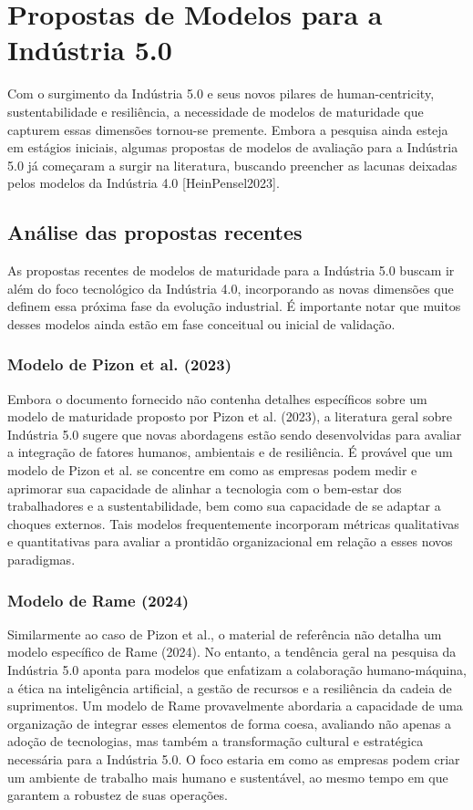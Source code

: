 \section{Propostas de Modelos para a Indústria 5.0}

Com o surgimento da Indústria 5.0 e seus novos pilares de human-centricity, sustentabilidade e resiliência, a necessidade de modelos de maturidade que capturem essas dimensões tornou-se premente. Embora a pesquisa ainda esteja em estágios iniciais, algumas propostas de modelos de avaliação para a Indústria 5.0 já começaram a surgir na literatura, buscando preencher as lacunas deixadas pelos modelos da Indústria 4.0 [HeinPensel2023].

\subsection{Análise das propostas recentes}

As propostas recentes de modelos de maturidade para a Indústria 5.0 buscam ir além do foco tecnológico da Indústria 4.0, incorporando as novas dimensões que definem essa próxima fase da evolução industrial. É importante notar que muitos desses modelos ainda estão em fase conceitual ou inicial de validação.

\subsubsection{Modelo de Pizon et al. (2023)}

Embora o documento fornecido não contenha detalhes específicos sobre um modelo de maturidade proposto por Pizon et al. (2023), a literatura geral sobre Indústria 5.0 sugere que novas abordagens estão sendo desenvolvidas para avaliar a integração de fatores humanos, ambientais e de resiliência. É provável que um modelo de Pizon et al. se concentre em como as empresas podem medir e aprimorar sua capacidade de alinhar a tecnologia com o bem-estar dos trabalhadores e a sustentabilidade, bem como sua capacidade de se adaptar a choques externos. Tais modelos frequentemente incorporam métricas qualitativas e quantitativas para avaliar a prontidão organizacional em relação a esses novos paradigmas.

\subsubsection{Modelo de Rame (2024)}

Similarmente ao caso de Pizon et al., o material de referência não detalha um modelo específico de Rame (2024). No entanto, a tendência geral na pesquisa da Indústria 5.0 aponta para modelos que enfatizam a colaboração humano-máquina, a ética na inteligência artificial, a gestão de recursos e a resiliência da cadeia de suprimentos. Um modelo de Rame provavelmente abordaria a capacidade de uma organização de integrar esses elementos de forma coesa, avaliando não apenas a adoção de tecnologias, mas também a transformação cultural e estratégica necessária para a Indústria 5.0. O foco estaria em como as empresas podem criar um ambiente de trabalho mais humano e sustentável, ao mesmo tempo em que garantem a robustez de suas operações.

